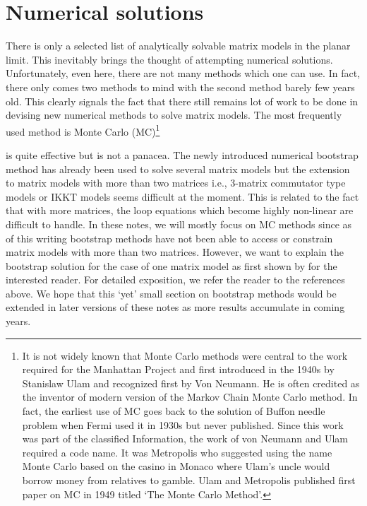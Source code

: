 \documentclass[11pt]{article}
\begin{document}
\section{Numerical solutions} 

There is only a selected list of analytically solvable matrix models in the planar limit. This inevitably brings 
the thought of attempting numerical solutions. Unfortunately, even here, there are not many methods 
which one can use. In fact, there only comes two methods to mind with the second method barely few years old. 
This clearly signals the fact that there still remains lot of work to be done in devising new numerical 
methods to solve matrix models. The most frequently used method is Monte Carlo (MC)\footnote{
It is not widely known that Monte Carlo methods were central to the work required for the Manhattan Project
and first introduced in the 1940s by Stanislaw Ulam and recognized first by Von Neumann. 
He is often credited as the inventor of modern version of the Markov Chain Monte Carlo 
method. In fact, the earliest use of MC goes back to the solution of Buffon needle problem when Fermi used it in 1930s but never published. 
Since this work was part of the classified Information, the work of von Neumann and Ulam required a code name. It was Metropolis who 
suggested using the name Monte Carlo based on the casino in 
Monaco where Ulam's uncle would borrow money from relatives to gamble. Ulam and Metropolis
published first paper on MC in 1949 titled `The Monte Carlo Method'.} 

is quite effective but is not a panacea. 
The newly introduced numerical bootstrap method has already been used to solve several matrix models \cite{Anderson:2016rcw,Lin:2020mme,Han:2020bkb,Kazakov:2021lel} but the extension to matrix models with more than two matrices i.e., 3-matrix commutator type models or IKKT models seems difficult at the moment. This is related to the fact that with more matrices, the loop equations which become highly non-linear are difficult to handle.
In these notes, we will mostly focus on MC methods since as of this writing bootstrap methods have not been able to access or constrain matrix models with more than two matrices. However, we want to explain the bootstrap solution for the case of one matrix model as first shown by \cite{Lin:2020mme} for the interested reader. For detailed exposition, we refer the reader to the references above. We hope that this `yet' small section on bootstrap methods would be extended in later versions of these notes as more results accumulate in coming years. 
\end{document}
